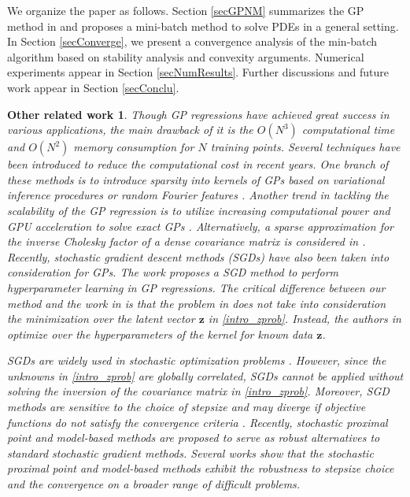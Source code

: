\documentclass[10pt,reqno]{amsart}
\newcommand{\1}{{\chi}}
\numberwithin{equation}{section}
\theoremstyle{thmlemcorr}
\numberwithin{theorem}{section}
\theoremstyle{thmlemcorr*}
\theoremstyle{defi}
\theoremstyle{remexample}
\theoremstyle{ass}
\newtheorem*{relatedwork*}{Other related work}
\begin{document}
We organize the paper as follows. Section \ref{secGPNM}  summarizes the GP method in \cite{chen2021solving} and proposes a mini-batch method to solve PDEs in a general setting. In Section \ref{secConverge}, we present a convergence analysis of the min-batch algorithm based on stability analysis and convexity arguments. 
Numerical experiments appear in Section \ref{secNumResults}. 
Further discussions and future work appear in Section \ref{secConclu}. 

\begin{relatedwork*}
	Though GP regressions have achieved great success in various applications, the main drawback of it is the $O(N^3)$ computational time and $O(N^2)$ memory consumption for $N$ training points. Several techniques have been introduced to reduce the computational cost in recent years. One branch of these methods is to introduce sparsity into kernels of GPs based on variational inference procedures \cite{quinonero2005unifying, damianou2016variational, Hensman_2013, lazaro2009inter, wilson2015kernel, liu2020gaussian} or random Fourier features \cite{hensman2017variational, yu2016orthogonal, rahimi2007random, lazaro2010sparse}. Another trend in tackling the scalability of the GP regression is to utilize increasing computational power and GPU acceleration to solve exact GPs \cite{nguyen2019exact, gardner2018gpytorch, wang2019exact}. Alternatively, a sparse approximation for the inverse Cholesky factor of a dense covariance matrix is considered in 
	\cite{schafer2021sparse}. Recently, stochastic gradient descent methods (SGDs) have also been taken into consideration for GPs. The work \cite{chen2020stochastic} proposes a SGD method to perform hyperparameter learning in GP regressions. The critical difference between our method and the work in \cite{chen2020stochastic} is that the problem in \cite{chen2020stochastic}  does not take into consideration the minimization over the latent vector $\boldsymbol{z}$ in \eqref{intro_zprob}. Instead, the authors in \cite{chen2020stochastic} optimize over the hyperparameters of the kernel for known data  $\boldsymbol{z}$. 
	
	SGDs are widely used in stochastic optimization problems \cite{bottou2007tradeoffs, nemirovski2009robust, shalev2007pegasos, zinkevich2003online}. However, since the unknowns in \eqref{intro_zprob} are globally correlated, SGDs cannot be applied without solving the inversion of the covariance matrix in \eqref{intro_zprob}. Moreover, SGD methods are sensitive to the choice of stepsize and may diverge if objective functions do not satisfy the convergence criteria \cite{asi2019importance, asi2019stochastic, li2017hyperband}. Recently, stochastic proximal point and model-based methods \cite{asi2019stochastic, bertsekas2011incremental, davis2019stochastic, duchi2018stochastic, kulis2010implicit} are proposed to serve as robust alternatives to standard stochastic gradient methods. Several works \cite{duchi2018stochastic, davis2019stochastic} show that the stochastic proximal point and model-based methods exhibit the robustness to stepsize choice and the convergence on a broader range of difficult problems. 
\end{relatedwork*}
\end{document}
